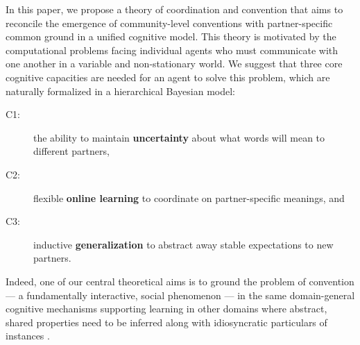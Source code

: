 In this paper, we propose a theory of coordination and convention that aims to reconcile the emergence of community-level conventions with partner-specific common ground in a unified cognitive model.
This theory is motivated by the computational problems facing individual agents who must communicate with one another in a variable and non-stationary world. 
We suggest that three core cognitive capacities are needed for an agent to solve this problem, which are naturally formalized in a hierarchical Bayesian model:
\begin{description}
\item[C1:] the ability to maintain \textbf{uncertainty} about what words will mean to different partners,
\item[C2:] flexible  \textbf{online learning} to coordinate on partner-specific meanings, and
\item[C3:] inductive \textbf{generalization} to abstract away stable expectations to new partners.
\end{description}
Indeed, one of our central theoretical aims is to ground the problem of convention --- a fundamentally interactive, social phenomenon --- in the same domain-general cognitive mechanisms supporting learning in other domains where abstract, shared properties need to be inferred along with idiosyncratic particulars of instances \cite{berniker2008estimating,GoodmanUllmanTenenbaum11_TheoryOfCausality,tenenbaum_how_2011,kleinschmidt2015robust}.

